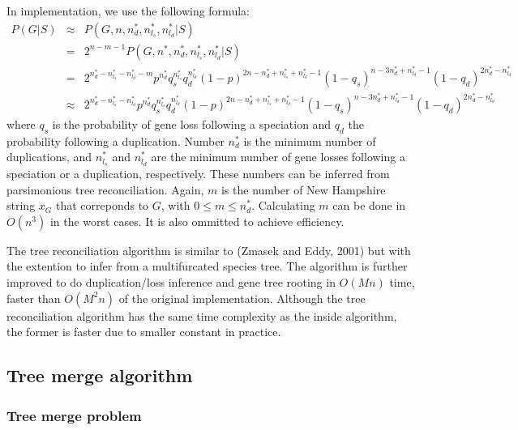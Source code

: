 \documentclass[pdftex,10pt]{article}
\begin{document}
In implementation, we use the following formula:
\begin{eqnarray*}
  P(G|S)&\approx&P(G,n,n^*_d,n^*_{l_s},n^*_{l_d}|S)\\
  &=&2^{n-m-1}P(G,n^*,n^*_d,n^*_{l_s},n^*_{l_d}|S)\\
  &=&2^{n^*_d-n^*_{l_s}-n^*_{l_d}-m}p^{n^*_d}q_s^{n^*_{l_s}}q_d^{n^*_{l_d}}
  (1-p)^{2n-n^*_d+n^*_{l_s}+n^*_{l_d}-1}(1-q_s)^{n-3n^*_d+n^*_{l_d}-1}(1-q_d)^{2n^*_d-n^*_{l_d}}\\
  &\approx&2^{n^*_d-n^*_{l_s}-n^*_{l_d}}p^{n^*_d}q_s^{n^*_{l_s}}q_d^{n^*_{l_d}}
  (1-p)^{2n-n^*_d+n^*_{l_s}+n^*_{l_d}-1}(1-q_s)^{n-3n^*_d+n^*_{l_d}-1}(1-q_d)^{2n^*_d-n^*_{l_d}}
\end{eqnarray*}
where $q_s$ is the probability of gene loss following a speciation and
$q_d$ the probability following a duplication. Number $n^*_d$ is the
minimum number of duplications, and $n^*_{l_s}$ and $n^*_{l_d}$ are the
minimum number of gene losses following a speciation or a duplication,
respectively. These numbers can be inferred from parsimonious tree
reconciliation. Again, $m$ is the number of New Hampshire string $x_G$
that correponds to $G$, with $0\leq m\leq n_d^*$. Calculating $m$ can be
done in $O(n^3)$ in the worst cases. It is also ommitted to achieve
efficiency.

The tree reconciliation algorithm is similar to (Zmasek and Eddy, 2001)
but with the extention to infer from a multifurcated species tree. The
algorithm is further improved to do duplication/loss inference and gene
tree rooting in $O(Mn)$ time, faster than $O(M^2n)$ of the original
implementation. Although the tree reconciliation algorithm has the same
time complexity as the inside algorithm, the former is faster due to
smaller constant in practice.

\subsection{Tree merge algorithm}

\subsubsection{Tree merge problem}
\end{document}
